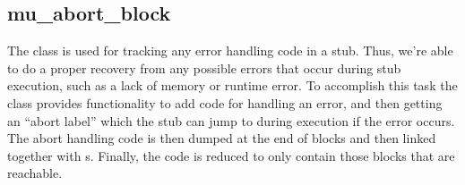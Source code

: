 \subsection{mu\_abort\_block}
\label{subsec:BE:muabortblock}

The  class is used for tracking any error handling code
in a stub.  Thus, we're able to do a proper recovery from any possible errors
that occur during stub execution, such as a lack of memory or runtime error.
To accomplish this task the class provides functionality to add code for
handling an error, and then getting an ``abort label'' which the stub can jump
to during execution if the error occurs.  The abort handling code is then
dumped at the end of blocks and then linked together with s.
Finally, the code is reduced to only contain those blocks that are reachable.

